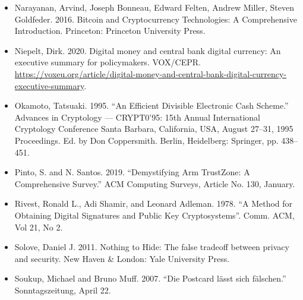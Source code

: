 \documentclass[10pt,spanish]{article}
\begin{document}
\begin{itemize}
\item Narayanan, Arvind, Joseph Bonneau, Edward Felten, Andrew Miller, Steven
Goldfeder. 2016. Bitcoin and Cryptocurrency Technologies: A
Comprehensive Introduction. Princeton: Princeton University Press.
\end{itemize}

\begin{itemize}
\item Niepelt, Dirk. 2020. Digital money and central bank digital currency: An
executive summary for policymakers. VOX/CEPR.
\href{https://voxeu.org/article/digital-money-and-central-bank-digital-currency-executive-summary}{{https://voxeu.org/article/digital-money-and-central-bank-digital-currency-executive-summary}}.
\end{itemize}

\begin{itemize}
\item Okamoto, Tatsuaki. 1995. ``An Efficient Divisible Electronic Cash
Scheme.'' Advances in Cryptology --- CRYPT0'95: 15th Annual
International Cryptology Conference Santa Barbara, California, USA,
August 27--31, 1995 Proceedings. Ed. by Don Coppersmith. Berlin,
Heidelberg: Springer, pp. 438--451.
\end{itemize}

\begin{itemize}
\item Pinto, S. and N. Santos. 2019. ``Demystifying Arm TrustZone: A
Comprehensive Survey.'' ACM Computing Surveys, Article No. 130, January.
\end{itemize}

\begin{itemize}
\item Rivest, Ronald L., Adi Shamir, and Leonard Adleman. 1978. ``A Method for
Obtaining Digital Signatures and Public Key Cryptosystems''. Comm. ACM,
Vol 21, No 2.
\end{itemize}

\begin{itemize}
\item Solove, Daniel J. 2011. Nothing to Hide: The false tradeoff between
privacy and security. New Haven \& London: Yale University Press.
\end{itemize}

\begin{itemize}
\item Soukup, Michael and Bruno Muff. 2007. ``Die Postcard lässt sich
fälschen.'' Sonntagszeitung, April 22.
\end{itemize}
\end{document}
